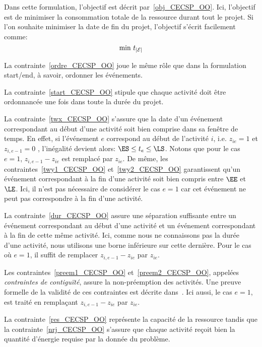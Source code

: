 Dans cette formulation, l'objectif est décrit
par~\eqref{obj_CECSP_OO}. Ici, l'objectif est de minimiser la
consommation totale de la ressource durant tout le projet. Si 
l'on souhaite minimiser la date de fin du projet, l'objectif s'écrit 
facilement comme: 
\begin{equation}
\text{min } t_{|{\cal E}|} \notag
\end{equation} 

La contrainte~\eqref{ordre_CECSP_OO} joue le même rôle que dans la
formulation start/end, à savoir, ordonner les événements.

La contrainte~\eqref{start_CECSP_OO} stipule que chaque activité doit
être ordonnancée une fois dans toute la durée du projet.
 
La contrainte~\eqref{twx_CECSP_OO} s'assure que la date d'un événement
correspondant au début d'une activité soit bien comprise dans sa
fenêtre de temps.  En effet, si l'événement $e$ correspond au début de
l'activité $i$, i.e. $z_{ie}=1$ et $z_{i,e-1}=0$ , l'inégalité devient
alors: $\ES \le t_e \le \LS$. Notons que pour le cas $e=1$,
$z_{i,e-1}-z_{ie}$ est remplacé par $z_{ie}$. De même, les
contraintes~\eqref{twy1_CECSP_OO} et~\eqref{twy2_CECSP_OO}
garantissent qu'un événement correspondant à la fin d'une activité
soit bien compris entre $\EE$ et $\LE$. Ici, il n'est pas
nécessaire de considérer le cas $e=1$ car cet événement ne peut pas
correspondre à la fin d'une activité. 

La contrainte~\eqref{dur_CECSP_OO} assure une séparation suffisante
entre un événement correspondant au début d'une activité et un
événement correspondant à la fin de cette même activité. Ici, comme
nous ne connaissons pas la durée d'une activité, nous utilisons une
borne inférieure sur cette dernière. Pour le cas où $e=1$, il suffit
de remplacer $z_{i,e-1}-z_{ie}$ par $z_{ie}$.

Les contraintes~\eqref{preem1_CECSP_OO} et~\eqref{preem2_CECSP_OO},
appelées {\it contraintes de contiguïté}, assure la non-préemption des
activités. Une preuve formelle de la validité de ces contraintes est
décrite dans~\cite{modele_RCPSP}. Ici aussi, le cas $e=1$, est 
traité en remplaçant $z_{i,e-1}-z_{ie}$ par $z_{ie}$.

La contrainte~\eqref{res_CECSP_OO} représente la capacité de
la ressource tandis que la contrainte~\eqref{nrj_CECSP_OO} s'assure
que chaque activité reçoit bien la quantité d'énergie requise par la
donnée du problème.

